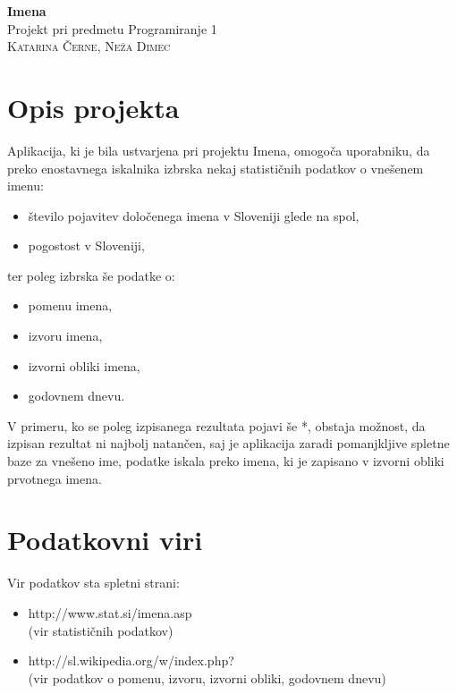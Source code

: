 \documentclass[a4paper, 12pt]{article}
\begin{document}
\begin{center}
{\huge\textbf{Imena}}\\
{\large{Projekt pri predmetu Programiranje 1}}\\
{\large\textsc{Katarina Černe, Neža Dimec}}
\end{center}

\tableofcontents

\newpage

\section{Opis projekta}

Aplikacija, ki je bila ustvarjena pri projektu Imena, omogoča uporabniku, da preko enostavnega iskalnika izbrska nekaj statističnih podatkov o vnešenem imenu:

\begin{itemize}
\item število pojavitev določenega imena v Sloveniji glede na spol,
\item pogostost v Sloveniji,
\end{itemize}

\noindent ter poleg izbrska še podatke o:

\begin{itemize}
\item pomenu imena,
\item izvoru imena,
\item izvorni obliki imena,
\item godovnem dnevu.
\end{itemize}

V primeru, ko se poleg izpisanega rezultata pojavi še *, obstaja možnost, da izpisan rezultat ni najbolj natančen, saj je aplikacija zaradi pomanjkljive spletne baze za vnešeno ime, podatke iskala preko imena, ki je zapisano v izvorni obliki prvotnega imena.

\section{Podatkovni viri}

Vir podatkov sta spletni strani:
\begin{itemize}
\item http://www.stat.si/imena.asp\\
(vir statističnih podatkov)
\item http://sl.wikipedia.org/w/index.php?\\
(vir podatkov o pomenu, izvoru, izvorni obliki, godovnem dnevu)
\end{itemize}
\end{document}
